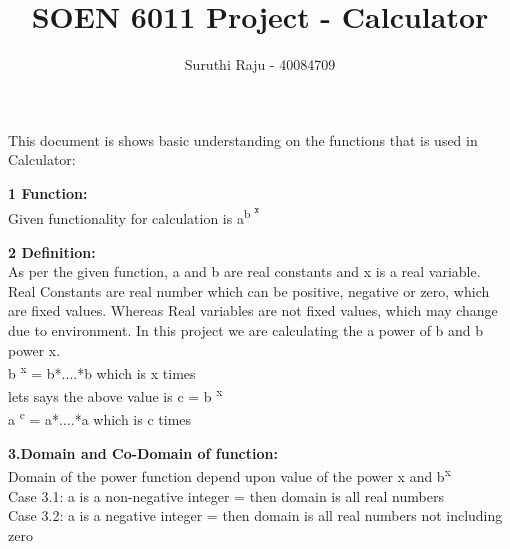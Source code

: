 \documentclass[a4paper,10pt]{article}
\title{SOEN 6011 Project - Calculator}
\author{Suruthi Raju - 40084709}
\date{}
\begin{document}
\maketitle

{\fontsize{12}{16}\selectfont This document is shows basic understanding on the functions that is used in Calculator: \\} 

{\Large\textbf{1 Function:}\\}
\newline
\indent\indent
{\fontsize{12}{16}\selectfont Given functionality for calculation is  a\textsuperscript{b \textsuperscript{x}}\\}

{\Large\textbf{2 Definition:}\\}
\newline
\indent\indent
{\fontsize{12}{16}\selectfont As per the given function, a and b are real constants and x is a real variable. Real Constants are real number which can be positive, negative or zero, which are fixed values. Whereas Real variables are not fixed values, which may change due to environment. In this project we are calculating the a power of b and b power x. \\}
\newline
\indent\indent
{\fontsize{12}{16}\selectfont b \textsuperscript{x} = b*....*b which is x times \\}
\newline
\indent\indent
{\fontsize{12}{16}\selectfont lets says the above value is c = b \textsuperscript{x} \\}
\newline
\indent\indent
{\fontsize{12}{16}\selectfont a \textsuperscript{c} = a*....*a which is c times \\}

{\Large\textbf{3.Domain and Co-Domain of function:} \\}
\newline
\indent\indent
{\fontsize{12}{16}\selectfont Domain of the power function depend upon value of the power x and b\textsuperscript{x} \\}
\newline
\indent\indent
{\fontsize{12}{16}\selectfont Case 3.1: a is a non-negative integer = then domain is all real numbers  \\ }
\newline
\indent\indent
{\fontsize{12}{16}\selectfont Case 3.2: a is a negative integer = then  domain is all real numbers not including zero  \\}
\end{document}
